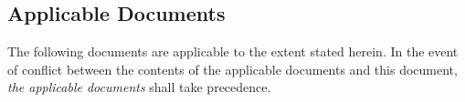 \documentclass[11pt,a4paper]{article}
\begin{document}

\sdplistoffigures

\sdplistoftables

\sdpsummary


\newpage

\sdpreferencedocs

\subsection*{Applicable Documents}

The following documents are applicable to the extent stated herein. In the
event of conflict between the contents of the applicable documents and this
document, \emph{the applicable documents} shall take precedence.
\end{document}
